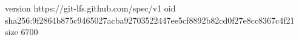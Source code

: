 version https://git-lfs.github.com/spec/v1
oid sha256:9f2864b875c9465027acba92703522447ee5cf8892b82cd0f27e8cc8367c4f21
size 6700
